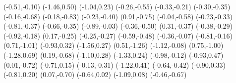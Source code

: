 \psdot[](-0.51,-0.10)
\psdot[](-1.46,0.50)
\psdot[](-1.04,0.23)
\psdot[](-0.26,-0.55)
\psdot[](-0.33,-0.21)
\psdot[](-0.30,-0.35)
\psdot[](-0.16,-0.68)
\psdot[](-0.18,-0.83)
\psdot[](-0.23,-0.40)
\psdot[](0.91,-0.75)
\psdot[](-0.04,-0.58)
\psdot[](-0.23,-0.33)
\psdot[](-0.81,-0.37)
\psdot[](-0.66,-0.35)
\psdot[](-0.89,-0.03)
\psdot[](-0.36,-0.50)
\psdot[](0.31,-0.37)
\psdot[](-0.38,-0.29)
\psdot[](-0.92,-0.18)
\psdot[](0.17,-0.25)
\psdot[](-0.25,-0.27)
\psdot[](-0.59,-0.48)
\psdot[](-0.36,-0.07)
\psdot[](-0.81,-0.16)
\psdot[](0.71,-1.01)
\psdot[](-0.93,0.32)
\psdot[](-1.56,0.27)
\psdot[](0.51,-1.26)
\psdot[](-1.12,-0.08)
\psdot[](0.75,-1.00)
\psdot[](-1.28,0.69)
\psdot[](0.19,-0.68)
\psdot[](-1.10,0.28)
\psdot[](-1.33,0.24)
\psdot[](-0.98,-0.12)
\psdot[](-0.93,0.47)
\psdot[](0.01,-0.72)
\psdot[](-0.71,0.15)
\psdot[](-0.13,-0.31)
\psdot[](-1.22,0.41)
\psdot[](-0.64,-0.42)
\psdot[](-0.90,0.33)
\psdot[](-0.81,0.20)
\psdot[](0.07,-0.70)
\psdot[](-0.64,0.02)
\psdot[](-1.09,0.08)
\psdot[](-0.46,-0.67)
